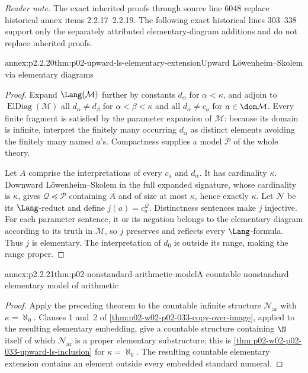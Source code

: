 \noindent\textit{Reader note.} The exact inherited proofs through source line 6048
replace historical annex items 2.2.17--2.2.19.  The following exact historical
lines 303--338 support only the separately attributed elementary-diagram
additions and do not replace inherited proofs.

\begin{annexitem}{annex:p2.2.20}{thm:p02-upward-ls-elementary-extension}{Upward L\"owenheim--Skolem via elementary diagrams}
\begin{proof}
Expand \(\Lang(\mathcal M)\) further by constants
\(d_\alpha\) for \(\alpha<\kappa\), and adjoin to
\(\operatorname{ElDiag}(\mathcal M)\) all
\(d_\alpha\ne d_\beta\) for \(\alpha<\beta<\kappa\) and all
\(d_\alpha\ne c_a\) for \(a\in\dom\mathcal M\).  Every finite fragment is
satisfied by the parameter expansion of \(\mathcal M\): because its domain
is infinite, interpret the finitely many occurring \(d_\alpha\) as distinct
elements avoiding the finitely many named \(a\)'s.  Compactness supplies a
model \(\mathcal P\) of the whole theory.

Let \(A\) comprise the interpretations of every \(c_a\) and
\(d_\alpha\).  It has cardinality \(\kappa\).  Downward
L\"owenheim--Skolem in the full expanded signature, whose cardinality is
\(\kappa\), gives
\(\mathcal Q\preccurlyeq\mathcal P\) containing \(A\) and of size at most
\(\kappa\), hence exactly \(\kappa\).  Let \(\mathcal N\) be its
\(\Lang\)-reduct and define \(j(a)=c_a^{\mathcal Q}\).  Distinctness
sentences make \(j\) injective.  For each parameter sentence, it or its
negation belongs to the elementary diagram according to its truth in
\(\mathcal M\), so \(j\) preserves and reflects every \(\Lang\)-formula.
Thus \(j\) is elementary.  The interpretation of
\(d_0\) is outside its range, making the range proper.
\end{proof}
\end{annexitem}

\begin{annexitem}{annex:p2.2.21}{thm:p02-nonstandard-arithmetic-model}{A countable nonstandard elementary model of arithmetic}
\begin{proof}
Apply the preceding theorem to the countable infinite structure
\(\mathcal N_{\mathrm{ar}}\) with \(\kappa=\aleph_0\).  Clauses 1 and~2 of
\cref{thm:p02-w02-p02-033-copy-over-image}, applied to the resulting
elementary embedding, give a countable structure containing \(\N\) itself
of which \(\mathcal N_{\mathrm{ar}}\) is a proper elementary substructure;
this is \cref{thm:p02-w02-p02-033-upward-ls-inclusion} for
\(\kappa=\aleph_0\).  The resulting countable elementary extension contains
an element outside every embedded standard numeral.
\end{proof}
\end{annexitem}
